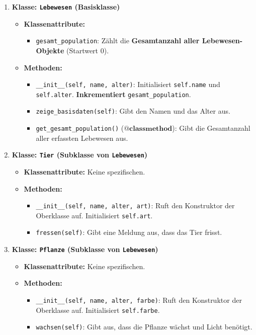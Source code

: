 \begin{enumerate}
    \item \textbf{Klasse: \texttt{Lebewesen} (Basisklasse)}
    \begin{itemize}
        \item \textbf{Klassenattribute:}
        \begin{itemize}
            \item \texttt{gesamt\_population}: Zählt die \textbf{Gesamtanzahl aller Lebewesen-Objekte} (Startwert 0).
        \end{itemize}
        \item \textbf{Methoden:}
        \begin{itemize}
            \item \texttt{\_\_init\_\_(self, name, alter)}: Initialisiert \texttt{self.name} und \texttt{self.alter}. \textbf{Inkrementiert} \texttt{gesamt\_population}.
            \item \texttt{zeige\_basisdaten(self)}: Gibt den Namen und das Alter aus.
            \item \texttt{get\_gesamt\_population()} ($\mathbf{@classmethod}$): Gibt die Gesamtanzahl aller erfassten Lebewesen aus.
        \end{itemize}
    \end{itemize}
    \item \textbf{Klasse: \texttt{Tier} (Subklasse von \texttt{Lebewesen})}
    \begin{itemize}
        \item \textbf{Klassenattribute:} Keine spezifischen.
        \item \textbf{Methoden:}
        \begin{itemize}
            \item \texttt{\_\_init\_\_(self, name, alter, art)}: Ruft den Konstruktor der Oberklasse auf. Initialisiert \texttt{self.art}.
            \item \texttt{fressen(self)}: Gibt eine Meldung aus, dass das Tier frisst.
        \end{itemize}
    \end{itemize}
    
    \item \textbf{Klasse: \texttt{Pflanze} (Subklasse von \texttt{Lebewesen})}
    \begin{itemize}
        \item \textbf{Klassenattribute:} Keine spezifischen.
        \item \textbf{Methoden:}
        \begin{itemize}
            \item \texttt{\_\_init\_\_(self, name, alter, farbe)}: Ruft den Konstruktor der Oberklasse auf. Initialisiert \texttt{self.farbe}.
            \item \texttt{wachsen(self)}: Gibt aus, dass die Pflanze wächst und Licht benötigt.
        \end{itemize}
    \end{itemize}


\end{enumerate}
